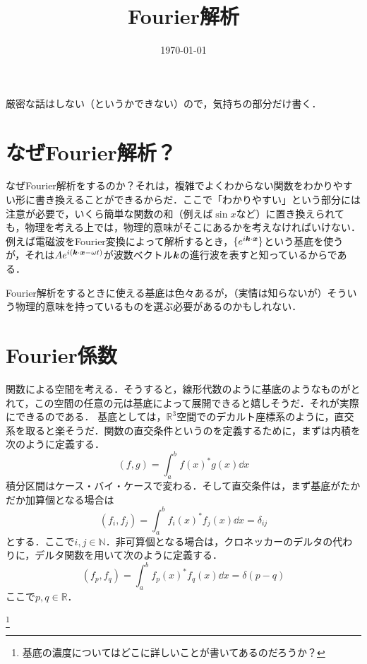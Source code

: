 \documentclass[a4paper,10pt,uplatex]{jsarticle}
\begin{document}
\title{Fourier解析}
\author{}
\date{\today}
\maketitle

厳密な話はしない（というかできない）ので，気持ちの部分だけ書く．

\section{なぜFourier解析？}
なぜFourier解析をするのか？それは，複雑でよくわからない関数をわかりやすい形に書き換えることができるからだ．ここで「わかりやすい」という部分には注意が必要で，いくら簡単な関数の和（例えば$\sin x$など）に置き換えられても，物理を考える上では，物理的意味がそこにあるかを考えなければいけない．例えば電磁波をFourier変換によって解析するとき，$\{e^{i\vb*{k}\cdot\vb*{x}}\}$という基底を使うが，それは$Ae^{i(\vb*{k}\cdot\vb*{x} - \omega t)}$が波数ベクトル$\vb*{k}$の進行波を表すと知っているからである．

Fourier解析をするときに使える基底は色々あるが，（実情は知らないが）そういう物理的意味を持っているものを選ぶ必要があるのかもしれない．

\section{Fourier係数}
関数による空間を考える．そうすると，線形代数のように基底のようなものがとれて，この空間の任意の元は基底によって展開できると嬉しそうだ．それが実際にできるのである．
基底としては，$\mathbb{R}^3$空間でのデカルト座標系のように，直交系を取ると楽そうだ．関数の直交条件というのを定義するために，まずは内積を次のように定義する．
\begin{equation}
    (f, g) = \int_{a}^{b} f(x)^* g(x) \dd{x}
\end{equation}
積分区間はケース・バイ・ケースで変わる．そして直交条件は，まず基底がたかだか加算個となる場合は
\begin{equation}
    (f_i, f_j) = \int_{a}^{b} f_i(x)^* f_j(x) \dd{x} = \delta_{ij}
\end{equation}
とする．ここで$i,j \in \mathbb{N}$．非可算個となる場合は，クロネッカーのデルタの代わりに，デルタ関数を用いて次のように定義する．
\begin{equation}
    (f_p, f_q) = \int_{a}^{b} f_p(x)^*f_q(x) \dd{x} = \delta(p-q)
\end{equation}
ここで$p,q \in \mathbb{R}$．

\footnote{基底の濃度についてはどこに詳しいことが書いてあるのだろうか？}
\end{document}
